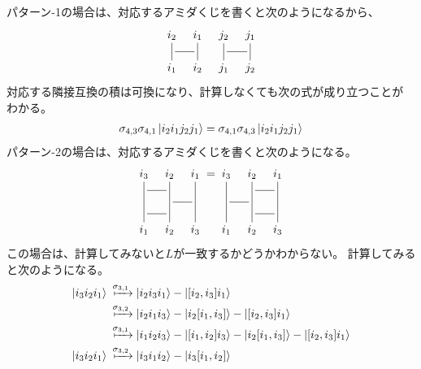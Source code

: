 {	パターン-1の場合は、対応するアミダくじを書くと次のようになるから、
	\begin{equation*}\xymatrix@R=1ex@C=2ex{
		i_2 \ar@{-}[dd] & i_1 \ar@{-}[dd] & j_2 \ar@{-}[dd] & j_1 \ar@{-}[dd] \\
		\ar@{-}[r] & & \ar@{-}[r] & \\
		i_1 & i_2 & j_1 & j_2 \\
	}\end{equation*}
	対応する隣接互換の積は可換になり、計算しなくても次の式が成り立つことが
	わかる。
	\begin{equation*}\begin{split}
		\sigma_{4,3}\sigma_{4,1}\mathinner{|{i_2i_1j_2j_1}\rangle} 
		= \sigma_{4,1}\sigma_{4,3}\mathinner{|{i_2i_1j_2j_1}\rangle}
	\end{split}\end{equation*}
	パターン-2の場合は、対応するアミダくじを書くと次のようになる。
	\begin{equation*}\begin{split}
		\xymatrix@R=1ex@C=2ex{
			i_3 \ar@{-}[dddd] & i_2 \ar@{-}[dddd] & i_1 \ar@{-}[dddd] \\
			\ar@{-}[r] & \\
			& \ar@{-}[r] & \\
			\ar@{-}[r] & \\
			i_1 & i_2 & i_3 \\
		} =	\xymatrix@R=1ex@C=2ex{
			i_3 \ar@{-}[dddd] & i_2 \ar@{-}[dddd] & i_1 \ar@{-}[dddd] \\
			& \ar@{-}[r] & \\
			\ar@{-}[r] & \\
			& \ar@{-}[r] & \\
			i_1 & i_2 & i_3 \\
		}
	\end{split}\end{equation*}
	この場合は、計算してみないと$L$が一致するかどうかわからない。
	計算してみると次のようになる。
	\begin{equation*}\begin{split}
		\ket{i_3i_2i_1}
		&\xmapsto{\sigma_{3,1}} \ket{i_2i_3i_1} - \ket{[i_2,i_3]i_1} \\
		&\xmapsto{\sigma_{3,2}} \ket{i_2i_1i_3} 
			- \ket{i_2[i_1,i_3]} - \ket{[i_2,i_3]i_1} \\
		&\xmapsto{\sigma_{3,1}} \ket{i_1i_2i_3} 
			- \ket{[i_1,i_2]i_3} - \ket{i_2[i_1,i_3]} - \ket{[i_2,i_3]i_1} \\
		\ket{i_3i_2i_1}
		&\xmapsto{\sigma_{3,2}} \ket{i_3i_1i_2} - \ket{i_3[i_1,i_2]} \\

\end{split}
\end{equation*}}

